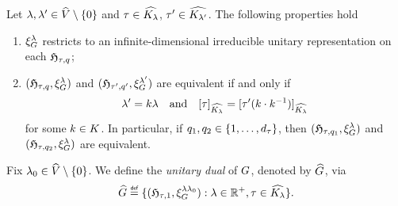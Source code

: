 \begin{proposition}
\label{proposition:unitary_dual}
    Let $\lambda, \lambda' \in {\widehat{V}} \setminus \{0\}$
    and $\tau \in {\widehat{{{K}_{\lambda}}}}$,
    $\tau' \in {\widehat{{{K}_{\lambda'}}}}$.
    The following properties hold
    \begin{enumerate}
        \item $\xi^{\lambda}_{G}$ restricts to an infinite-dimensional irreducible unitary representation on each $\mathfrak{H}_{\tau, q}$;
        \item $(\mathfrak{H}_{\tau, q}, \xi^{\lambda}_{G})$ and $(\mathfrak{H}_{\tau', q'}, \xi^{\lambda'}_{G})$ are equivalent if and only if
            \begin{align*}
                \lambda' = k \lambda \quad \text{and} \quad {{[\tau]}_{{\widehat{{{K}_{\lambda}}}}}} = {{[\tau'(k \cdot k^{-1})]}_{{\widehat{{{K}_{\lambda}}}}}}
            \end{align*}
            for some $k \in K$.
            In particular, if $q_1, q_2 \in \{1, \dots, {d_{\tau}}\}$,
            then $(\mathfrak{H}_{\tau, q_1}, \xi^{\lambda}_{G})$ and $(\mathfrak{H}_{\tau, q_2}, \xi^{\lambda}_{G})$ are equivalent.
    \end{enumerate}
\end{proposition}

\begin{definition}
\label{definition:unitary_dual_of_motion_group}
    Fix $\lambda_0 \in {\widehat{V}} \setminus \{0\}$.
    We define the \emph{unitary dual} of $G$, denoted by ${\widehat{G}}$, via
    \begin{align*}
        \dualGroup{\Group} \defeq \{ (\Hilbert{\tau}{1}, \Rep{\lambda \lambda_0}) : \lambda \in \R^+, \tau \in \dualGroup{\IsotropySubgroup{\CompactGroup}{\lambda}} \}.
    \end{align*}
\end{definition}

